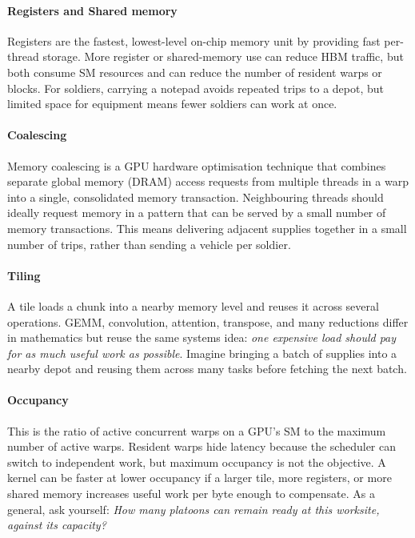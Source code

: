 \paragraph{Registers and Shared memory}
Registers are the fastest, lowest-level on-chip memory unit by providing fast per-thread storage.
More register or shared-memory use can reduce HBM traffic, but both consume SM resources and can reduce the number of resident warps or blocks.
For soldiers, carrying a notepad avoids repeated trips to a depot, but limited space for equipment means fewer soldiers can work at once.


\paragraph{Coalescing}
Memory coalescing is a GPU hardware optimisation technique that combines separate global memory (DRAM) access requests from multiple threads in a warp into a single, consolidated memory transaction.
Neighbouring threads should ideally request memory in a pattern that can be served by a small number of memory transactions.
This means delivering adjacent supplies together in a small number of trips, rather than sending a vehicle per soldier.


\paragraph{Tiling}
A tile loads a chunk into a nearby memory level and reuses it across several operations.
GEMM, convolution, attention, transpose, and many reductions differ in mathematics but reuse the same systems idea: \textit{one expensive load should pay for as much useful work as possible}.
Imagine bringing a batch of supplies into a nearby depot and reusing them across many tasks before fetching the next batch.

\paragraph{Occupancy}
This is the ratio of active concurrent warps on a GPU's SM to the maximum number of active warps.
Resident warps hide latency because the scheduler can switch to independent work, but maximum occupancy is not the objective.
A kernel can be faster at lower occupancy if a larger tile, more registers, or more shared memory increases useful work per byte enough to compensate.
As a general, ask yourself: \textit{How many platoons can remain ready at this worksite, against its capacity?}

